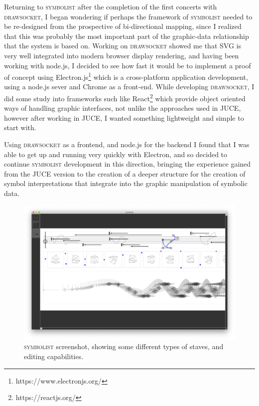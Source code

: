 \documentclass{article}
\def\symbolist{\textsc{symbolist}\xspace}
\def\drawsocket{\textsc{drawsocket}\xspace}
\begin{document}
Returning to \symbolist after the completion of the first concerts with \drawsocket, I began wondering if perhaps the framework of \symbolist needed to be re-designed from the prospective of bi-directional mapping, since I realized that this was probably the most important part of the graphic-data relationship that the system is based on. Working on \drawsocket showed me that SVG is very well integrated into modern browser display rendering, and having been working with node.js, I decided to see how fast it would be to implement a proof of concept using Electron.js\footnote{https://www.electronjs.org/} which is a cross-platform application development, using a node.js sever and Chrome as a front-end. While developing \drawsocket, I did some study into frameworks such like React\footnote{https://reactjs.org/} which provide object oriented ways of handling graphic interfaces, not unlike the approaches used in JUCE, however after working in JUCE, I wanted something lightweight and simple to start with.

Using \drawsocket as a frontend, and node.js for the backend I found that I was able to get up and running very quickly with Electron, and so decided to continue \symbolist development in this direction, bringing the experience gained from the JUCE version to the creation of a deeper structure for the creation of symbol interpretations that integrate into the graphic manipulation of symbolic data. 

\begin{figure}[ht!]
\centering
\includegraphics[width=2\columnwidth]{symbolist.png}
\caption{ \symbolist screenshot, showing some different types of staves, and editing capabilities.
\label{fig:screenshot}}
\end{figure}
\end{document}
